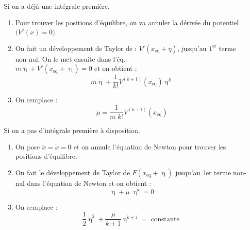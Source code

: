 \documentclass[a4paper]{article}
\begin{document}
\begin{tcolorbox}[title=\textcolor{black}{G. Étude de la stabilité - Méthode des petites perturbations}, colback=white, colframe=sprinen, sharp corners]

    \begin{tcolorbox}[colback=white,colframe=white,sharp corners,sidebyside,lefthand ratio=0.5]
    Si on a déjà une intégrale première, 
    \begin{enumerate}
        \item Pour trouver les positions d'équilibre, on va annuler la dérivée du potentiel $ \big( V'(x) = 0 \big) $.
        \item On fait un développement de Taylor de : $ V'(x_{\text{eq}} + \eta) $, jusqu'au $ 1^{\text{er}} $ terme non-nul. On le met ensuite dans l'éq. \\ $ m \ddot{\upeta} + V'(x_{\text{eq}} + \upeta) = 0 $ et on obtient : \[ m \ddot{\upeta} + \frac{1}{k !} V^{(k + 1)} (x_{\text{eq}}) \upeta^k \]
        \item On remplace : \[ \mu = \frac{1}{m \; k !} V^{(k + 1)} (x_{\text{eq}}) \]
    \end{enumerate}
    \tcblower
    Si on a pas d'intégrale première à disposition, 
    \begin{enumerate}
        \item On pose $ \ddot{x} = \dot{x} = 0 $ et on annule l'équation de Newton pour trouver les positions d'équilibre.
        \item On fait le développement de Taylor de $ F(x_{\text{eq}} + \upeta) $ jusqu'au 1er terme non-nul dans l'équation de Newton et on obtient : \[ \ddot{\upeta} + \mu \; \upeta^k = 0 \]
        \item On remplace : \[ \frac{1}{2} \dot{\upeta}^2 + \frac{\mu}{k + 1} \upeta^{k + 1} = \text{ constante } \]
    \end{enumerate}
    \end{tcolorbox}


\tcblower
\begin{center}  \end{center}


\end{tcolorbox}
\end{document}
